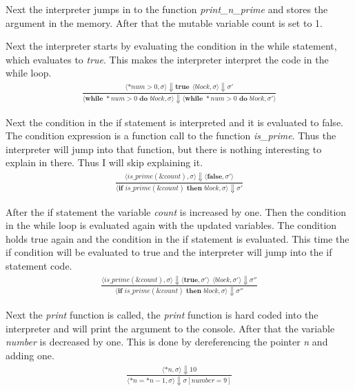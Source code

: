 \documentclass[12pt]{article}
\begin{document}
	Next the interpreter jumps in to the function \emph{print\_n\_prime} and stores the argument in the memory. After that the mutable variable count is set to 1.

	Next the interpreter starts by evaluating the condition in the while statement, which evaluates to \emph{true}. This makes the interpreter interpret the code in the while loop.
	\begin{align*}
		\frac{\langle *num > 0, \sigma \rangle\Downarrow \textbf{true} \ \
		\langle block, \sigma \rangle\Downarrow \sigma'}
		{\langle \textbf{while } *num > 0 \textbf{ do } block, \sigma \rangle\Downarrow \langle \textbf{while } *num > 0 \textbf{ do } block, \sigma' \rangle}
	\end{align*}

	Next the condition in the if statement is interpreted and it is evaluated to false. The condition expression is a function call to the function \emph{is\_prime}. Thus the interpreter will jump into that function, but there is nothing interesting to explain in there. Thus I will skip explaining it.
	\begin{align*}
		\frac{\langle is\_prime(\&count), \sigma \rangle\Downarrow \langle \textbf{false}, \sigma' \rangle}
		{\langle \textbf{if } is\_prime(\&count) \textbf{ then } block, \sigma \rangle\Downarrow \sigma'}
	\end{align*}

	After the if statement the variable \emph{count} is increased by one. Then the condition in the while loop is evaluated again with the updated variables. The condition holds true again and the condition in the if statement is evaluated. This time the if condition will be evaluated to true and the interpreter will jump into the if statement code.
	\begin{align*}
		\frac{\langle is\_prime(\&count), \sigma \rangle\Downarrow \langle \textbf{true}, \sigma' \rangle \ \
		\langle block, \sigma' \rangle\Downarrow \sigma''}
		{\langle \textbf{if } is\_prime(\&count) \textbf{ then } block, \sigma \rangle\Downarrow \sigma''}
	\end{align*}

	Next the \emph{print} function is called, the \emph{print} function is hard coded into the interpreter and will print the argument to the console. After that the variable \emph{number} is decreased by one. This is done by dereferencing the pointer \emph{n} and adding one.
	\begin{align*}
		\frac{\langle *n, \sigma \rangle\Downarrow 10}
		{\langle *n = *n - 1, \sigma \rangle\Downarrow \sigma[number = 9]}
	\end{align*}
	
\end{document}
